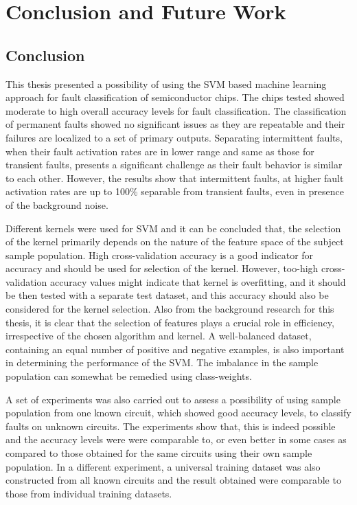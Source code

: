 \chapter{Conclusion and Future Work}
\label{chap:chapter7}
\section{Conclusion}

This thesis presented a possibility of using the SVM based machine learning approach for fault classification of semiconductor chips. The chips tested showed moderate to high overall accuracy levels for fault classification. The classification of permanent faults showed no significant issues as they are repeatable and their failures are localized to a set of primary outputs. Separating intermittent faults, when their fault activation rates are in lower range and same as those for transient faults, presents a significant challenge as their fault behavior is similar to each other. However, the results show that intermittent faults, at higher fault activation rates are up to 100\% separable from transient faults, even in presence of the background noise.


Different kernels were used for SVM and it can be concluded that, the selection of the kernel primarily depends on the nature of the feature space of the subject sample population. High cross-validation accuracy is a good indicator for accuracy and should be used for selection of the kernel. However, too-high cross-validation accuracy values might indicate that kernel is overfitting, and it should be then tested with a separate test dataset, and this accuracy should also be considered for the kernel selection. Also from the background research for this thesis, it is clear that the selection of features plays a crucial role in efficiency, irrespective of the chosen algorithm and kernel. A well-balanced dataset, containing an equal number of positive and negative examples, is also important in determining the performance of the SVM. The imbalance in the sample population can somewhat be remedied using class-weights.

A set of experiments was also carried out to assess a possibility of using sample population from one known circuit, which showed good accuracy levels, to classify faults on unknown circuits. The experiments show that, this is indeed possible and the accuracy levels were were comparable to, or even better in some cases as compared to those obtained for the same circuits using their own sample population. In a different experiment,  a universal training dataset was also constructed from all known circuits and the result obtained were comparable to those from individual training datasets.

